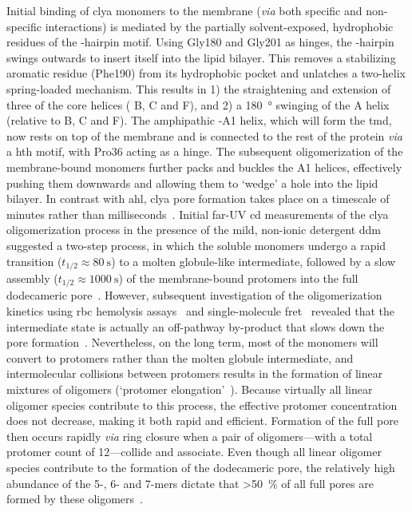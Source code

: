 Initial binding of \gls{clya} monomers to the membrane (\textit{via} both specific and non-specific
interactions) is mediated by the partially solvent-exposed, hydrophobic residues of the \tb-hairpin motif.
Using Gly180 and Gly201 as hinges, the \tb-hairpin swings outwards to insert itself into the lipid bilayer.
This removes a stabilizing aromatic residue (Phe190) from its hydrophobic pocket and unlatches a two-helix
spring-loaded mechanism. This results in 1) the straightening and extension of three of the core helices (\ta
B, \ta C and \ta F), and 2) a \SI{180}{\degree} swinging of the \ta A helix (relative to \ta B, \ta C and \ta
F). The amphipathic \ta-A1 helix, which will form the \gls{tmd}, now rests on top of the membrane and is
connected to the rest of the protein \textit{via} a \gls{hth} motif, with Pro36 acting as a hinge. The
subsequent oligomerization of the membrane-bound monomers further packs and buckles the \ta A1 helices,
effectively pushing them downwards and allowing them to `wedge' a hole into the lipid bilayer. In contrast
with \gls{ahl}, \gls{clya} pore formation takes place on a timescale of minutes rather than
milliseconds~\cite{Benke-2015}. Initial far-UV \gls{cd} measurements of the \gls{clya} oligomerization process
in the presence of the mild, non-ionic detergent \gls{ddm} suggested a two-step process, in which the soluble
monomers undergo a rapid transition ($t_{1/2} \approx \SI{80}{\second}$) to a molten globule-like
intermediate, followed by a slow assembly  ($t_{1/2} \approx \SI{1000}{\second}$) of the membrane-bound
protomers into the full dodecameric pore~\cite{Eifler-2006}. However, subsequent investigation of the
oligomerization kinetics using \gls{rbc} hemolysis assays~\cite{Vaidyanathan-2014} and single-molecule
\gls{fret}~\cite{Benke-2015} revealed that the intermediate state is actually an off-pathway by-product that
slows down the pore formation~\cite{Roderer-2017}. Nevertheless, on the long term, most of the monomers will
convert to protomers rather than the molten globule intermediate, and intermolecular collisions between
protomers results in the formation of linear mixtures of oligomers (`protomer
elongation'~\cite{Roderer-2017}). Because virtually all linear oligomer species contribute to this process,
the effective protomer concentration does not decrease, making it both rapid and efficient. Formation of the
full pore then occurs rapidly \textit{via} ring closure when a pair of oligomers---with a total protomer count
of 12---collide and associate. Even though all linear oligomer species contribute to the formation of the
dodecameric pore, the relatively high abundance of the 5-, 6- and 7-mers dictate that \SI{>50}{\percent} of
all full pores are formed by these oligomers~\cite{Benke-2015}.



